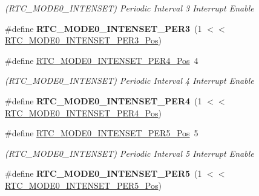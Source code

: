 \begin{DoxyCompactItemize}
\begin{DoxyCompactList}\small\item\em (R\+T\+C\+\_\+\+M\+O\+D\+E0\+\_\+\+I\+N\+T\+E\+N\+S\+E\+T) Periodic Interval 3 Interrupt Enable \end{DoxyCompactList}\item 
\hypertarget{group___s_a_m_l21___r_t_c_ga8f6070f4125326c25dc836a018fdbc09}{}\#define {\bfseries R\+T\+C\+\_\+\+M\+O\+D\+E0\+\_\+\+I\+N\+T\+E\+N\+S\+E\+T\+\_\+\+P\+E\+R3}~(1 $<$$<$ \hyperlink{group___s_a_m_l21___r_t_c_gae79a72435f76270c96e08dc85e15057e}{R\+T\+C\+\_\+\+M\+O\+D\+E0\+\_\+\+I\+N\+T\+E\+N\+S\+E\+T\+\_\+\+P\+E\+R3\+\_\+\+Pos})\label{group___s_a_m_l21___r_t_c_ga8f6070f4125326c25dc836a018fdbc09}

\item 
\hypertarget{group___s_a_m_l21___r_t_c_ga138e484426c7f415baed282774524832}{}\#define \hyperlink{group___s_a_m_l21___r_t_c_ga138e484426c7f415baed282774524832}{R\+T\+C\+\_\+\+M\+O\+D\+E0\+\_\+\+I\+N\+T\+E\+N\+S\+E\+T\+\_\+\+P\+E\+R4\+\_\+\+Pos}~4\label{group___s_a_m_l21___r_t_c_ga138e484426c7f415baed282774524832}

\begin{DoxyCompactList}\small\item\em (R\+T\+C\+\_\+\+M\+O\+D\+E0\+\_\+\+I\+N\+T\+E\+N\+S\+E\+T) Periodic Interval 4 Interrupt Enable \end{DoxyCompactList}\item 
\hypertarget{group___s_a_m_l21___r_t_c_ga239daba75f4591879f27cc57e775d603}{}\#define {\bfseries R\+T\+C\+\_\+\+M\+O\+D\+E0\+\_\+\+I\+N\+T\+E\+N\+S\+E\+T\+\_\+\+P\+E\+R4}~(1 $<$$<$ \hyperlink{group___s_a_m_l21___r_t_c_ga138e484426c7f415baed282774524832}{R\+T\+C\+\_\+\+M\+O\+D\+E0\+\_\+\+I\+N\+T\+E\+N\+S\+E\+T\+\_\+\+P\+E\+R4\+\_\+\+Pos})\label{group___s_a_m_l21___r_t_c_ga239daba75f4591879f27cc57e775d603}

\item 
\hypertarget{group___s_a_m_l21___r_t_c_ga962f9a5a75446effeab3de686fdf19ef}{}\#define \hyperlink{group___s_a_m_l21___r_t_c_ga962f9a5a75446effeab3de686fdf19ef}{R\+T\+C\+\_\+\+M\+O\+D\+E0\+\_\+\+I\+N\+T\+E\+N\+S\+E\+T\+\_\+\+P\+E\+R5\+\_\+\+Pos}~5\label{group___s_a_m_l21___r_t_c_ga962f9a5a75446effeab3de686fdf19ef}

\begin{DoxyCompactList}\small\item\em (R\+T\+C\+\_\+\+M\+O\+D\+E0\+\_\+\+I\+N\+T\+E\+N\+S\+E\+T) Periodic Interval 5 Interrupt Enable \end{DoxyCompactList}\item 
\hypertarget{group___s_a_m_l21___r_t_c_gaa1084842a6936920124ccce7bf6b230c}{}\#define {\bfseries R\+T\+C\+\_\+\+M\+O\+D\+E0\+\_\+\+I\+N\+T\+E\+N\+S\+E\+T\+\_\+\+P\+E\+R5}~(1 $<$$<$ \hyperlink{group___s_a_m_l21___r_t_c_ga962f9a5a75446effeab3de686fdf19ef}{R\+T\+C\+\_\+\+M\+O\+D\+E0\+\_\+\+I\+N\+T\+E\+N\+S\+E\+T\+\_\+\+P\+E\+R5\+\_\+\+Pos})\label{group___s_a_m_l21___r_t_c_gaa1084842a6936920124ccce7bf6b230c}


\end{DoxyCompactItemize}

